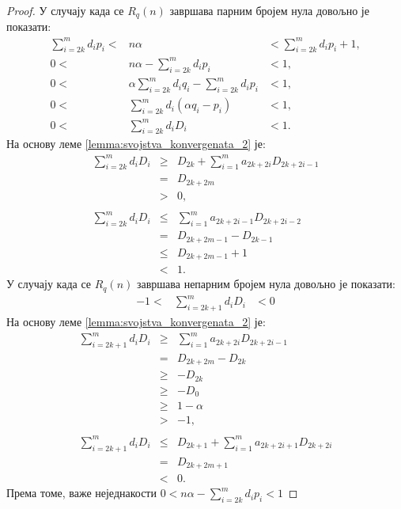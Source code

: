\documentclass[a4paper]{article}
\begin{document}
\begin{proof}
	У случају када се $ R_q(n) $ завршава парним бројем нула довољно је показати:	
	\begin{eqnarray*}
		\sum_{i = 2k}^{m} d_{i}p_{i} <& n\alpha &< \sum_{i = 2k}^{m} d_{i}p_{i} + 1,\\
		0 <& n\alpha - \sum_{i = 2k}^{m} d_{i}p_{i} &< 1,\\
		0 <& \alpha \sum_{i = 2k}^{m} d_{i}q_{i} - \sum_{i = 2k}^{m} d_{i}p_{i} &< 1,\\
		0 <& \sum_{i = 2k}^{m} d_{i}(\alpha q_{i} - p_{i}) &< 1,\\
		0 <& \sum_{i = 2k}^{m} d_{i}D_{i} &< 1.
	\end{eqnarray*}	
	На основу леме \ref{lemma:svojstva_konvergenata_2} је:
	\begin{eqnarray*}
		\sum_{i = 2k}^{m} d_{i}D_{i} &\geq& D_{2k} + \sum_{i=1}^{m}a_{2k+2i}D_{2k+2i-1}\\ 
		&=& D_{2k+2m}\\ 
		&>& 0,\\\\
		\sum_{i = 2k}^{m} d_{i}D_{i} &\leq& \sum_{i=1}^{m}a_{2k+2i-1}D_{2k+2i-2}\\ 
		&=& D_{2k+2m-1} - D_{2k-1}\\ 
		&\leq& D_{2k+2m-1} + 1\\ 
		&<& 1.
	\end{eqnarray*}
	У случају када се $ R_q(n) $ завршава непарним бројем нула довољно је показати:
	\begin{eqnarray*}
		-1 <& \sum_{i = 2k+1}^{m} d_{i}D_{i} &< 0
	\end{eqnarray*}
	На основу леме \ref{lemma:svojstva_konvergenata_2} је:	
	\begin{eqnarray*}
		\sum_{i = 2k+1}^{m} d_{i}D_{i} &\geq& \sum_{i=1}^{m}a_{2k+2i}D_{2k+2i-1}\\ 
		&=& D_{2k+2m} - D_{2k}\\ 
		&\geq& - D_{2k}\\
		&\geq& - D_{0}\\
		&\geq& 1-\alpha\\
		&>& -1,\\\\
		\sum_{i = 2k+1}^{m} d_{i}D_{i} &\leq& D_{2k+1} + \sum_{i=1}^{m}a_{2k+2i+1}D_{2k+2i}\\ 
		&=& D_{2k+2m+1}\\ 
		&<& 0.
	\end{eqnarray*}
	Према томе, важе неједнакости $ 0 < n\alpha - \sum_{i = 2k}^{m} d_{i}p_{i} < 1 $
\end{proof}
\end{document}
